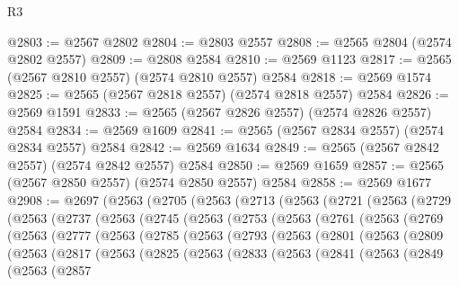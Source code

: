 \begin{lexlean}{R3}
\begin{coremodule}
@2803 := @2567 @2802
@2804 := @2803 @2557
@2808 := @2565 @2804 (@2574 @2802 @2557)
@2809 := @2808 @2584
@2810 := @2569 @1123
@2817 := @2565 (@2567 @2810 @2557) (@2574 @2810 @2557) @2584
@2818 := @2569 @1574
@2825 := @2565 (@2567 @2818 @2557) (@2574 @2818 @2557) @2584
@2826 := @2569 @1591
@2833 := @2565 (@2567 @2826 @2557) (@2574 @2826 @2557) @2584
@2834 := @2569 @1609
@2841 := @2565 (@2567 @2834 @2557) (@2574 @2834 @2557) @2584
@2842 := @2569 @1634
@2849 := @2565 (@2567 @2842 @2557) (@2574 @2842 @2557) @2584
@2850 := @2569 @1659
@2857 := @2565 (@2567 @2850 @2557) (@2574 @2850 @2557) @2584
@2858 := @2569 @1677
@2908 := @2697
    (@2563
      (@2705
        (@2563
          (@2713
            (@2563
              (@2721
                (@2563
                  (@2729
                    (@2563
                      (@2737
                        (@2563
                          (@2745
                            (@2563
                              (@2753
                                (@2563
                                  (@2761
                                    (@2563
                                      (@2769
                                        (@2563
                                          (@2777
                                            (@2563
                                              (@2785
                                                (@2563
                                                  (@2793
                                                    (@2563
                                                      (@2801
                                                        (@2563
                                                          (@2809
                                                            (@2563
                                                              (@2817
                                                                (@2563
                                                                  (@2825
                                                                    (@2563
                                                                      (@2833
                                                                        (@2563
                                                                          (@2841
                                                                            (@2563
                                                                              (@2849
                                                                                (@2563
                                                                                  (@2857

\end{coremodule}
\end{lexlean}
